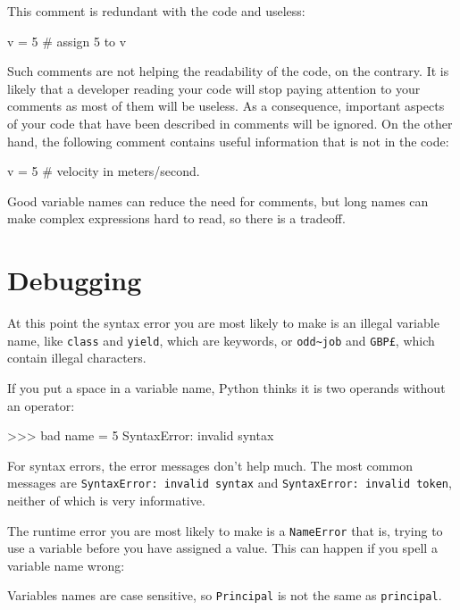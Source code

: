 This comment is redundant with the code and useless:

\beforeverb
\begin{pycode}
v = 5     # assign 5 to v
\end{pycode}
\afterverb
%
Such comments are not helping the readability of the code, on the contrary. It is likely that a developer reading your code will stop paying attention to your comments as most of them will be useless. As a consequence, important aspects of your code that have been described in comments will be ignored. On the other hand, the following comment contains useful information that is not in the code:

\beforeverb
\begin{pycode}
v = 5     # velocity in meters/second. 
\end{pycode}
\afterverb
%
Good variable names can reduce the need for comments, but
long names can make complex expressions hard to read, so there is
a tradeoff.

\section{Debugging}

At this point the syntax error you are most likely to make is
an illegal variable name, like {\tt class} and {\tt yield}, which
are keywords, or \verb"odd~job" and \verb"GBP£", which contain
illegal characters.


If you put a space in a variable name, Python thinks it is two
operands without an operator:

\beforeverb
\begin{pyinterpreter}
>>> bad name = 5
SyntaxError: invalid syntax
\end{pyinterpreter}
\afterverb
%
For syntax errors, the error messages don't help much.
The most common messages are {\tt SyntaxError: invalid syntax} and
{\tt SyntaxError: invalid token}, neither of which is very informative.


The runtime error you are most likely to make is a \verb|NameError| that is, trying to use a variable before you have assigned a value.  This can happen if you spell a variable name wrong:

\beforeverb
{}
\afterverb
%
Variables names are case sensitive, so {\tt Principal} is not the
same as {\tt principal}.

